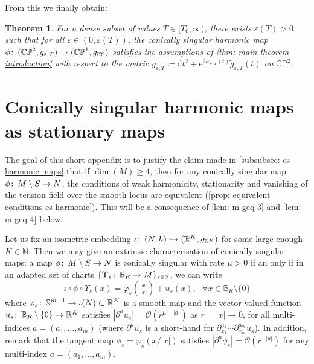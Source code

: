 \documentclass{article}
\numberwithin{equation}{section}        %
\theoremstyle{bfnote}
\newtheorem{thm}{Theorem}[section]          %
\theoremstyle{definition}
\theoremstyle{bfremark}
\newcommand{\col}{\colon \thinspace}        %
\newcommand{\N}{\mathbb{N}}                 %
\newcommand{\R}{\mathbb{R}}                 %
\newcommand{\Ball}{\mathbb{B}}              %
\newcommand{\Sp}{\mathbb{S}}                %
\newcommand{\diff}{\mathrm{d}}                      %
\begin{document}
From this we finally obtain:

\begin{thm}
    For a dense subset of values $T \in [T_0,\infty)$, there exists $\varepsilon(T) > 0$ such that for all $\varepsilon \in (0,\varepsilon(T))$, the conically singular harmonic map $\phi \col (\mathbb{CP}^2, g_{\varepsilon,T}) \to (\mathbb{CP}^1, g_{\mathrm{FS}})$ satisfies the assumptions of \cref{thm: main theorem introduction} with respect to the metric $g_{\varepsilon,T} \coloneqq \diff t^2 + \mathrm{e}^{2\kappa_{+,T}(t)} \widetilde{g}_{\varepsilon,T}(t)$ on $\mathbb{CP}^2$.
\end{thm}


\appendix

    \section{Conically singular harmonic maps as stationary maps}       \label{app: cs as stationary maps}


The goal of this short appendix is to justify the claim made in \cref{subsubsec: cs harmonic maps} that if $\dim(M) \geq 4$, then for any conically singular map $\phi \col M \setminus S \to N$, the conditions of weak harmonicity, stationarity and vanishing of the tension field over the smooth locus are equivalent (\cref{prop: equivalent conditions cs harmonic}). This will be a consequence of \cref{lem: m geq 3} and \cref{lem: m geq 4} below.

Let us fix an isometric embedding $\iota \col (N,h) \hookrightarrow (\R^K,g_{\R^K})$ for some large enough $K \in \N$. Then we may give an extrinsic characterisation of conically singular maps: a map $\phi \col M \setminus S \to N$ is conically singular with rate $\mu > 0$ if an only if in an adapted set of charts $\{\Upsilon_s \col \Ball_R \to M\}_{s \in S}$, we can write
\begin{equation*}
    \iota \circ \phi \circ \Upsilon_s(x) = \varphi_s(\tfrac{x}{|x|}) + u_s(x), ~~~ \forall x \in \Ball_R \setminus \{0\}
\end{equation*}
where $\varphi_s \col \Sp^{m-1} \to \iota(N) \subset \R^K$ is a smooth map and the vector-valued function $u_s \col \Ball_R \setminus \{0\} \to \R^K$ satisfies $|\partial^a u_s| = \mathcal{O}(r^{\mu-|a|})$ as $r = |x| \to 0$, for all multi-indices $a = (a_1,\ldots,a_m)$ (where $\partial^au_s$ is a short-hand for $\partial_{x_1}^{a_1}\cdots \partial^{a_m}_{x_m} u_s$). In addition, remark that the tangent map $\phi_s = \varphi_s(x/|x|)$ satisfies $|\partial^a\phi_s| = \mathcal{O}(r^{-|a|})$ for any multi-index $a = (a_1,\ldots,a_m)$.
\end{document}
